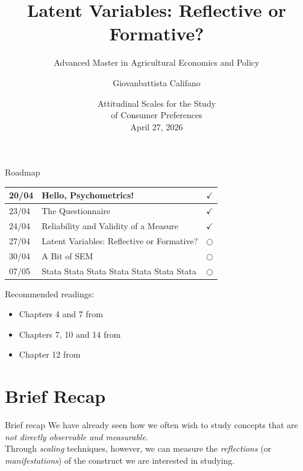 \documentclass{beamer}
\title[Lecture 4]{Latent Variables: Reflective or Formative?}
\subtitle{Advanced Master in Agricultural Economics and Policy}
\author{Giovanbattista Califano}
\date[Portici, 27/04/2026]{Attitudinal Scales for the Study \\ of Consumer Preferences \\April 27, 2026}
\institute[UNINA]{University of Naples Federico II, giovanbattista.califano@unina.it}
\begin{document}
\frame{\titlepage}

\begin{frame}{Roadmap}
    \begin{center}
        \begin{tabular}{|l|l|c|}
        \hline
        20/04 &  Hello, Psychometrics! & $\checkmark$ \\
        \hline
        23/04 &  The Questionnaire & $\checkmark$ \\
        \hline
        24/04 & Reliability and Validity of a Measure & $\checkmark$ \\
        \hline
        27/04 & Latent Variables: Reflective or Formative? & $\bigcirc$ \\
        \hline
        30/04 & A Bit of SEM & $\bigcirc$ \\
        \hline
        07/05 & Stata Stata Stata Stata Stata Stata Stata & $\bigcirc$ \\
        \hline
        \end{tabular}
    \end{center}
\vspace{0.1cm}
\footnotesize
Recommended readings: \\
\begin{itemize}
    \item Chapters 4 and 7 from \cite{jhangiani2019research}
    \item Chapters 7, 10 and 14 from \cite{olivero2022psicologia}
    \item Chapter 12 from \cite{mehmetoglu2022applied}
\end{itemize}
\scriptsize


\end{frame}

\section{Brief Recap}
\begin{frame}{Brief recap}
    We have already seen how we often wish to study concepts that are \textit{not directly observable and measurable}. \\
    \vspace{1em}
    Through \textit{scaling} techniques, however, we can measure the \textit{reflections} (or \textit{manifestations}) of the construct we are interested in studying.
\end{frame}
\end{document}

